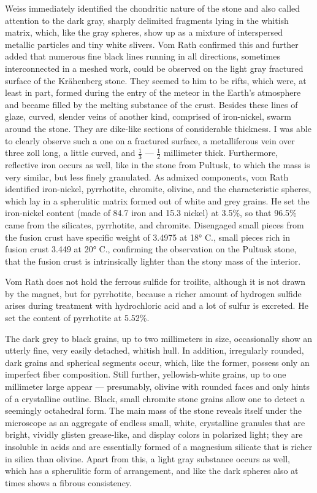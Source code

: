 \documentclass[a4paper, 12pt, oneside]{article}
\begin{document}
Weiss immediately identified the chondritic nature of the stone and also called attention to the dark gray, sharply delimited fragments lying in the whitish matrix, which, like the gray spheres, show up as a mixture of interspersed metallic particles and tiny white slivers. Vom Rath confirmed this and further added that numerous fine black lines running in all directions, sometimes interconnected in a meshed work, could be observed on the light gray fractured surface of the Krähenberg stone. They seemed to him to be rifts, which were, at least in part, formed during the entry of the meteor in the Earth's atmosphere and became filled by the melting substance of the crust. Besides these lines of glaze, curved, slender veins of another kind, comprised of iron-nickel, swarm around the stone. They are dike-like sections of considerable thickness. I was able to clearly observe such a one on a fractured surface, a metalliferous vein over three zoll long, a little curved, and $\frac{1}{3}$ --- $\frac{1}{2}$ millimeter thick. Furthermore, reflective iron occurs as well, like in the stone from Pultusk, to which the mass is very similar, but less finely granulated. As admixed components, vom Rath identified iron-nickel, pyrrhotite, chromite, olivine, and the characteristic spheres, which lay in a spherulitic matrix formed out of white and grey grains. He set the iron-nickel content (made of 84.7 iron and 15.3 nickel) at 3.5\%, so that 96.5\% came from the silicates, pyrrhotite, and chromite. Disengaged small pieces from the fusion crust have specific weight of 3.4975 at 18° C., small pieces rich in fusion crust 3.449 at 20° C., confirming the observation on the Pultusk stone, that the fusion crust is intrinsically lighter than the stony mass of the interior.

Vom Rath does not hold the ferrous sulfide for troilite, although it is not drawn by the magnet, but for pyrrhotite, because a richer amount of hydrogen sulfide arises during treatment with hydrochloric acid and a lot of sulfur is excreted. He set the content of pyrrhotite at 5.52\%.

The dark grey to black grains, up to two millimeters in size, occasionally show an utterly fine, very easily detached, whitish hull. In addition, irregularly rounded, dark grains and spherical segments occur, which, like the former, possess only an imperfect fiber composition. Still further, yellowish-white grains, up to one millimeter large appear --- presumably, olivine with rounded faces and only hints of a crystalline outline. Black, small chromite stone grains allow one to detect a seemingly octahedral form. The main mass of the stone reveals itself under the microscope as an aggregate of endless small, white, crystalline granules that are bright, vividly glisten grease-like, and display colors in polarized light; they are insoluble in acids and are essentially formed of a magnesium silicate that is richer in silica than olivine. Apart from this, a light gray substance occurs as well, which has a spherulitic form of arrangement, and like the dark spheres also at times shows a fibrous consistency.
\end{document}
